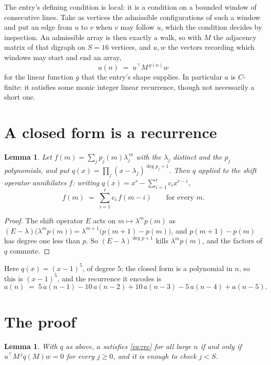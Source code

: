 \documentclass[11pt,a4paper]{article}
\theoremstyle{plain}
\newtheorem{lemma}[theorem]{Lemma}
\theoremstyle{definition}
\begin{document}
The entry's defining condition is local: it is a condition on a bounded window of consecutive lines. Take as vertices the
admissible configurations of such a window and put an edge from $u$ to $v$ when $v$ may
follow $u$, which the condition decides by inspection. An admissible array is then exactly a
walk, so with $M$ the adjacency matrix of that digraph on $S=16$ vertices, and $u,w$ the
vectors recording which windows may start and end an array,
\[
a(n)\;=\;u^{\!\top}M^{\,g(n)}w
\]
for the linear function $g$ that the entry's shape supplies. In particular $a$ is
$C$-finite: it satisfies some monic integer linear recurrence, though not necessarily a short
one.

\section{A closed form is a recurrence}

\begin{lemma}\label{lem:ann}
Let $f(m)=\sum_{j}p_j(m)\lambda_j^{\,m}$ with the $\lambda_j$ distinct and the $p_j$
polynomials, and put $q(x)=\prod_j(x-\lambda_j)^{\deg p_j+1}$. Then $q$ applied to the shift
operator annihilates $f$: writing $q(x)=x^{r}-\sum_{i=1}^{r}c_ix^{r-i}$,
\[
f(m)\;=\;\sum_{i=1}^{r}c_i\,f(m-i)\qquad\text{for every }m.
\]
\end{lemma}

\begin{proof}
The shift operator $E$ acts on $m\mapsto\lambda^{m}p(m)$ as
$(E-\lambda)\bigl(\lambda^{m}p(m)\bigr)=\lambda^{m+1}\bigl(p(m+1)-p(m)\bigr)$, and
$p(m+1)-p(m)$ has degree one less than $p$. So $(E-\lambda)^{\deg p+1}$ kills
$\lambda^{m}p(m)$, and the factors of $q$ commute.
\end{proof}

Here $q(x)=(x-1)^{5}$, of degree $5$; the closed form is a polynomial in $n$, so this is $(x-1)^{5}$, and the recurrence it encodes is
\begin{equation}\label{eq:rec}
a(n)\;=\;5\,a(n-1) - 10\,a(n-2) + 10\,a(n-3) - 5\,a(n-4) + a(n-5).
\end{equation}

\section{The proof}

\begin{lemma}\label{lem:crit}
With $q$ as above, $a$ satisfies \eqref{eq:rec} for all large $n$ if and only if
$u^{\!\top}M^{\,j}q(M)w=0$ for every $j\ge0$, and it is enough to check $j<S$.
\end{lemma}
\end{document}
